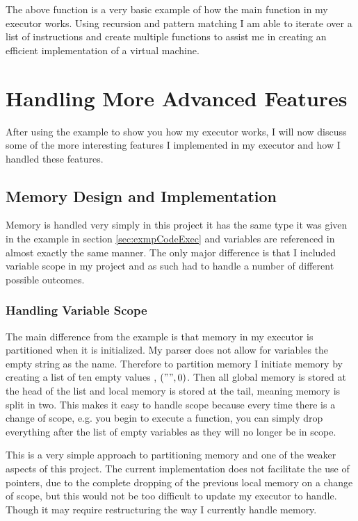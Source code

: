 The above function is a very basic example of how the main function in my executor works. Using recursion and pattern matching I am able to iterate over a list of instructions and create multiple functions to assist me in creating an efficient implementation of a virtual machine.  

\section{Handling More Advanced Features}

After using the example to show you how my executor works, I will now discuss some of the more interesting features I implemented in my executor and how I handled these features. 

\subsection{Memory Design and Implementation}

Memory is handled very simply in this project it has the same type it was given in the example in section \ref{sec:exmpCodeExec} and variables are referenced in almost exactly the same manner. The only major difference is that I included variable scope in my project and as such had to handle a number of different possible outcomes.

\subsubsection{Handling Variable Scope}

The main difference from the example is that memory in my executor is partitioned when it is initialized. My parser does not allow for variables the empty string as the name. Therefore to partition memory I initiate memory by creating a list of ten empty values , $("",0)$. Then all global memory is stored at the head of the list and local memory is stored at the tail, meaning memory is split in two. This makes it easy to handle scope because every time there is a change of scope, e.g. you begin to execute a function, you can simply drop everything after the list of empty variables as they will no longer be in scope.
  
This is a very simple approach to partitioning memory and one of the weaker aspects of this project. The current implementation does not facilitate the use of pointers, due to the complete dropping of the previous local memory  on a change of scope, but this would not be too difficult to update my executor to handle. Though it may require restructuring the way I currently handle memory.  


